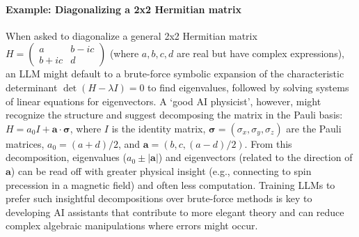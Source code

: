 \paragraph{Example: Diagonalizing a 2x2 Hermitian matrix}
When asked to diagonalize a general 2x2 Hermitian matrix $H = \begin{pmatrix} a & b-ic \\ b+ic & d \end{pmatrix}$ (where $a,b,c,d$ are real but have complex expressions), an LLM might default to a brute-force symbolic expansion of the characteristic determinant $\det(H - \lambda I) = 0$ to find eigenvalues, followed by solving systems of linear equations for eigenvectors. A `good AI physicist', however, might recognize the structure and suggest decomposing the matrix in the Pauli basis: $H = a_0 I + \mathbf{a} \cdot \boldsymbol{\sigma}$, where $I$ is the identity matrix, $\boldsymbol{\sigma} = (\sigma_x, \sigma_y, \sigma_z)$ are the Pauli matrices, $a_0 = (a+d)/2$, and $\mathbf{a} = (b, c, (a-d)/2)$. From this decomposition, eigenvalues ($a_0 \pm |\mathbf{a}|$) and eigenvectors (related to the direction of $\mathbf{a}$) can be read off with greater physical insight (e.g., connecting to spin precession in a magnetic field) and often less computation. Training LLMs to prefer such insightful decompositions over brute-force methods is key to developing AI assistants that contribute to more elegant theory and can reduce complex algebraic manipulations where errors might occur.

